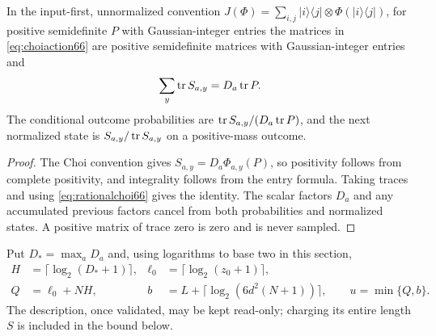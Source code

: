 \begin{lemma}\label{lem:choitrajectory66}
In the input-first, unnormalized convention
$J(\Phi)=\sum_{i,j}|i\rangle\langle j|\otimes\Phi(|i\rangle\langle j|)$,
for positive semidefinite $P$ with Gaussian-integer entries the matrices in
\eqref{eq:choiaction66} are positive semidefinite matrices with Gaussian-integer entries and
\[
                 \sum_y\operatorname{tr} S_{a,y}=D_a\operatorname{tr} P.
\]
The conditional outcome probabilities are
$\operatorname{tr} S_{a,y}/(D_a\operatorname{tr} P)$, and the next normalized state is
$S_{a,y}/\operatorname{tr} S_{a,y}$ on a positive-mass outcome.
\end{lemma}
\begin{proof}
The Choi convention gives $S_{a,y}=D_a\Phi_{a,y}(P)$, so positivity
follows from complete positivity, and integrality follows from the
entry formula. Taking traces and using \eqref{eq:rationalchoi66}
gives the identity. The scalar factors $D_a$ and any accumulated
previous factors cancel from both probabilities and normalized states.
A positive matrix of trace zero is zero and is never sampled.
\end{proof}

Put $D_* =\max_a D_a$ and, using logarithms to base two in this section,
\begin{align}
 H&=\lceil\log_2(D_*+1)\rceil,&
 \ell_0&=\lceil\log_2(z_0+1)\rceil,\nonumber\\
 Q&=\ell_0+NH,&
 b&=L+\lceil\log_2(6d^2(N+1))\rceil,\qquad
 u=\min\{Q,b\}.\label{eq:uniformparameters66}
\end{align}
The description, once validated, may be kept read-only; charging its
entire length $S$ is included in the bound below.

